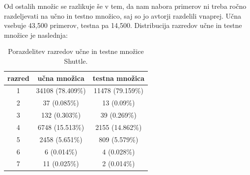 \documentclass[a4paper,12pt,openright]{book}
\begin{document}
    Od ostalih množic se razlikuje še v tem, da nam nabora primerov ni treba ročno razdeljevati na učno in testno
    množico, saj so jo avtorji razdelili vnaprej.
    Učna vsebuje 43,500 primerov, testna pa 14,500.
    Distribucija razredov učne in testne množice je naslednja:
    \begin{table}[H]
        \centering
        \begin{tabular}{||c c c||}
            \hline
            razred & učna množica     & testna množica \\ [0.5ex]
            \hline
            1      & 34108 (78.409\%) & 11478 (79.159\%) \\
            \hline
            2      & 37 (0.085\%)     & 13 (0.09\%)      \\
            \hline
            3      & 132 (0.303\%)    & 39 (0.269\%)     \\
            \hline
            4      & 6748 (15.513\%)  & 2155 (14.862\%)  \\
            \hline
            5      & 2458 (5.651\%)   & 809 (5.579\%)    \\
            \hline
            6      & 6 (0.014\%)      & 4 (0.028\%)      \\
            \hline
            7      & 11 (0.025\%)     & 2 (0.014\%)      \\
            \hline
        \end{tabular}
        \caption{Porazdelitev razredov učne in testne množice Shuttle.}
        \label{tab:shuttle_opis}
    \end{table}
\end{document}
